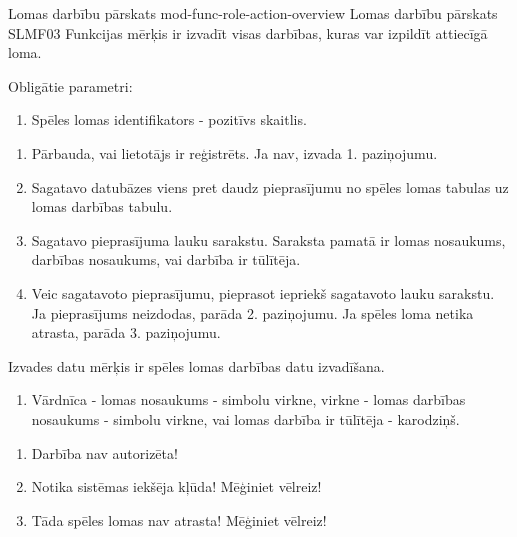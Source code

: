 \moduleFunctionTable
{Lomas darbību pārskats}
{mod-func-role-action-overview}
{Lomas darbību pārskats}
{SLMF03}
{
	Funkcijas mērķis ir izvadīt visas darbības, kuras var izpildīt attiecīgā loma.
}
{
	Obligātie parametri:
	\begin{enumerate}
		\item Spēles lomas identifikators - pozitīvs skaitlis.
	\end{enumerate}
}
{
	\begin{enumerate}
		\item Pārbauda, vai lietotājs ir reģistrēts. Ja nav, izvada 1. paziņojumu.
		\item Sagatavo datubāzes viens pret daudz pieprasījumu no spēles lomas tabulas uz lomas darbības tabulu.
		\item Sagatavo pieprasījuma lauku sarakstu. Saraksta pamatā ir lomas nosaukums, darbības nosaukums, vai darbība ir tūlītēja.
		\item Veic sagatavoto pieprasījumu, pieprasot iepriekš sagatavoto lauku sarakstu. Ja pieprasījums neizdodas, parāda 2. paziņojumu. Ja spēles loma netika atrasta, parāda 3. paziņojumu.
	\end{enumerate}
}
{
	Izvades datu mērķis ir spēles lomas darbības datu izvadīšana.
	\begin{enumerate}
		\item Vārdnīca - lomas nosaukums - simbolu virkne, virkne - lomas darbības nosaukums - simbolu virkne, vai lomas darbība ir tūlītēja - karodziņš.
	\end{enumerate}
}
{
	\begin{enumerate}
		\item Darbība nav autorizēta!
		\item Notika sistēmas iekšēja kļūda! Mēģiniet vēlreiz!
		\item Tāda spēles lomas nav atrasta! Mēģiniet vēlreiz!
	\end{enumerate}
}
